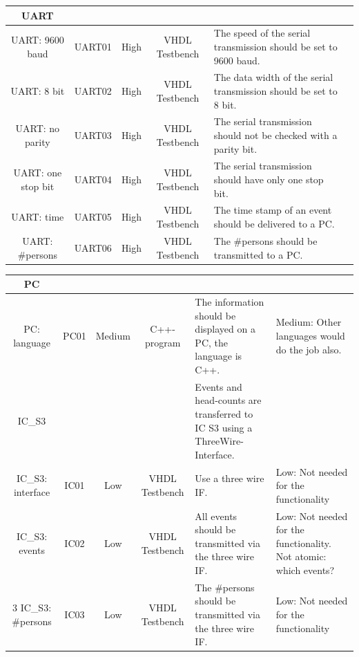 \documentclass[12pt,a4 paper] {article}
\begin{document}
\begin{center}
	\begin{tabular}{ |c|c|c|c|p{2cm}|p{2cm}| } 
		\hline
		UART & & & & & \\
		\hline
		UART: 9600 baud & UART01 & High &  VHDL Testbench & The speed of the serial transmission should be set to 9600 baud. & \\
		\hline
		UART: 8 bit & UART02 & High & VHDL Testbench & The data width of the serial transmission should be set to 8 bit. & \\
		\hline
		UART: no parity & UART03 & High & VHDL Testbench & The serial transmission should not be checked with a parity bit.& \\
		\hline
		UART: one stop bit & UART04 & High  & VHDL Testbench & The serial transmission should have only one stop bit. & \\
		\hline
		UART: time & UART05 & High & VHDL Testbench  & The time stamp of an event should be delivered to a PC. & \\
		\hline
		UART: \#persons & UART06 & High &  VHDL Testbench &  The \#persons should be transmitted to a PC. & \\
		\hline
	\end{tabular}
\end{center}
\begin{center}
	\begin{tabular}{ |c|c|c|c|p{2cm}|p{2cm}| } 
		\hline
		PC &&&&& \\
		\hline	
		PC: language & PC01 & Medium & C++-program &  The information should be displayed on a PC, the language is C++. & Medium: Other languages would do the job also.\\
		\hline
		IC\_S3 & & & &  Events and head-counts are transferred to IC S3 using a ThreeWire-Interface. & \\
		\hline
		IC\_S3: interface & IC01 & Low & VHDL Testbench & Use a three wire IF. & Low: Not needed for the functionality \\
		\hline
		IC\_S3: events & IC02 & Low & VHDL Testbench & All events should be transmitted via the three wire IF.& Low: Not needed for the functionality. Not atomic: which events?\\
		\hline3		IC\_S3: \#persons & IC03 & Low  & VHDL Testbench & The \#persons should be transmitted via the three wire IF. & Low: Not needed for the functionality \\
		\hline
	\end{tabular}
\end{center}
	
\end{document}
